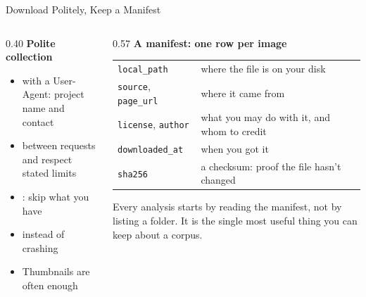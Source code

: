 \begin{frame}{Download Politely, Keep a Manifest}
\begin{columns}[T]
\begin{column}{0.40\textwidth}
\textbf{Polite collection}
\begin{itemize}
\item {} with a User-Agent: project name and contact
\item {} between requests and respect stated limits
\item {}: skip what you have
\item {} instead of crashing
\item Thumbnails are often enough
\end{itemize}
\end{column}
\begin{column}{0.57\textwidth}
\textbf{A manifest: one row per image}

\vspace{0.1cm}
{\footnotesize
\begin{tabular}{@{}lp{5.2cm}@{}}
\toprule
\texttt{local\_path} & where the file is on your disk \\
\texttt{source}, \texttt{page\_url} & where it came from \\
\texttt{license}, \texttt{author} & what you may do with it, and whom to credit \\
\texttt{downloaded\_at} & when you got it \\
\texttt{sha256} & a checksum: proof the file hasn't changed \\
\bottomrule
\end{tabular}}

\vspace{0.2cm}
\begin{greenbox}
Every analysis starts by reading the manifest, not by listing a folder. It is the single most
useful thing you can keep about a corpus.
\end{greenbox}
\end{column}
\end{columns}
\end{frame}

